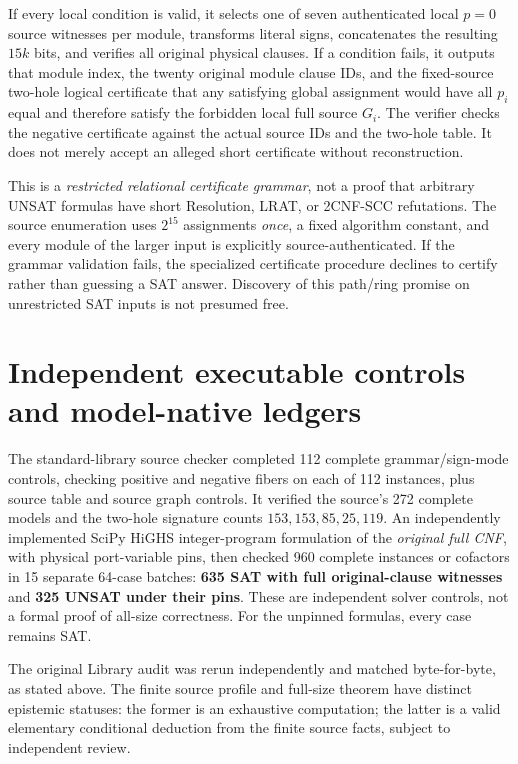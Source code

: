 \documentclass[11pt]{article}
\begin{document}
If every local condition is valid, it selects one of seven authenticated local $p=0$ source witnesses per module, transforms literal signs, concatenates the resulting $15k$ bits, and verifies all original physical clauses. If a condition fails, it outputs that module index, the twenty original module clause IDs, and the fixed-source two-hole logical certificate that any satisfying global assignment would have all $p_i$ equal and therefore satisfy the forbidden local full source $G_i$. The verifier checks the negative certificate against the actual source IDs and the two-hole table. It does not merely accept an alleged short certificate without reconstruction.

This is a \emph{restricted relational certificate grammar}, not a proof that arbitrary UNSAT formulas have short Resolution, LRAT, or 2CNF-SCC refutations. The source enumeration uses $2^{15}$ assignments \emph{once}, a fixed algorithm constant, and every module of the larger input is explicitly source-authenticated. If the grammar validation fails, the specialized certificate procedure declines to certify rather than guessing a SAT answer. Discovery of this path/ring promise on unrestricted SAT inputs is not presumed free.

\section{Independent executable controls and model-native ledgers}
The standard-library source checker completed 112 complete grammar/sign-mode controls, checking positive and negative fibers on each of 112 instances, plus source table and source graph controls. It verified the source's 272 complete models and the two-hole signature counts $153,153,85,25,119$. An independently implemented SciPy HiGHS integer-program formulation of the \emph{original full CNF}, with physical port-variable pins, then checked 960 complete instances or cofactors in 15 separate 64-case batches: \textbf{635 SAT with full original-clause witnesses} and \textbf{325 UNSAT under their pins}. These are independent solver controls, not a formal proof of all-size correctness. For the unpinned formulas, every case remains SAT.

The original Library audit was rerun independently and matched byte-for-byte, as stated above. The finite source profile and full-size theorem have distinct epistemic statuses: the former is an exhaustive computation; the latter is a valid elementary conditional deduction from the finite source facts, subject to independent review.
\end{document}
